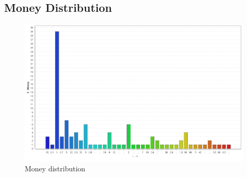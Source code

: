 \documentclass{vldb}
\begin{document}
\begin{appendices}
\section{Money Distribution}\label{money}
		\begin{figure}[h]
			\centering
			\includegraphics[scale=0.4]{3.png}
			\caption{Money distribution}
			\label{fig4}
		\end{figure}

\end{appendices}
\end{document}
